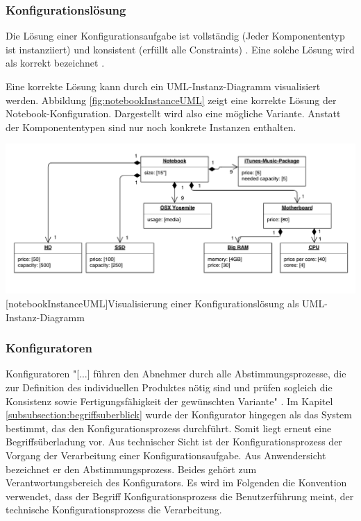 \documentclass[12pt,a4paper,bibliography=totocnumbered,listof=totoc]{scrartcl}
\begin{document}
\subsubsection{Konfigurationslösung}
\label{subsubsection:Konfigurationslösung}
Die Lösung einer Konfigurationsaufgabe ist vollständig (Jeder Komponententyp ist instanziiert) und konsistent (erfüllt alle Constraints) \citep[angelehnt an][]{falkner11}. Eine solche Lösung wird als korrekt bezeichnet \citep{soininen98}.

Eine korrekte Lösung kann durch ein UML-Instanz-Diagramm visualisiert werden.  Abbildung \ref{fig:notebookInstanceUML} zeigt eine korrekte Lösung der Notebook-Konfiguration. Dargestellt wird also eine mögliche Variante. Anstatt der Komponententypen sind nur noch konkrete Instanzen enthalten.

\vspace{1em}
\begin{minipage}{\linewidth}
	\centering
	\includegraphics[width=1\linewidth]{Abbildungen/notebookInstanceUML.pdf}
	[notebookInstanceUML]{Visualisierung einer Konfigurationslösung als UML-Instanz-Diagramm}
	\label{fig:notebookInstanceUML}
\end{minipage}
\vspace{1em}

\subsubsection{Konfiguratoren}
\label{subsubsection:Konfigurationssysteme}
Konfiguratoren "[...] führen den Abnehmer durch alle Abstimmungsprozesse, die zur Definition des individuellen Produktes nötig sind und prüfen sogleich die Konsistenz sowie Fertigungsfähigkeit der gewünschten Variante" \citep{piller06}. Im Kapitel \ref{subsubsection:begriffsuberblick} wurde der Konfigurator hingegen als das System bestimmt, das den Konfigurationsprozess durchführt. Somit liegt erneut eine Begriffsüberladung vor. Aus technischer Sicht ist der Konfigurationsprozess der Vorgang der Verarbeitung einer Konfigurationsaufgabe. Aus Anwendersicht bezeichnet er den Abstimmungsprozess. Beides gehört zum Verantwortungsbereich des Konfigurators. Es wird im Folgenden die Konvention verwendet, dass der Begriff \glqq Konfigurationsprozess\grqq{} die Benutzerführung meint, der \glqq technische Konfigurationsprozess\grqq{} die Verarbeitung.
\end{document}
